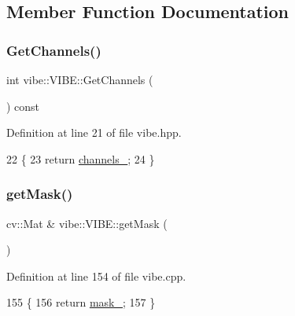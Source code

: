 \subsection{Member Function Documentation}
\mbox{\label{classvibe_1_1_v_i_b_e_a8d325dc6deb7fc6e53e2c5074611c434}} 
\subsubsection{\texorpdfstring{Get\+Channels()}{GetChannels()}}
{\footnotesize\ttfamily int vibe\+::\+V\+I\+B\+E\+::\+Get\+Channels (\begin{DoxyParamCaption}{ }\end{DoxyParamCaption}) const\hspace{0.3cm}{\ttfamily [inline]}}



Definition at line 21 of file vibe.\+hpp.


\begin{DoxyCode}
22     \{
23         \textcolor{keywordflow}{return} \mbox{\hyperlink{classvibe_1_1_v_i_b_e_a141be141bc39ddd6b9dd04df62b5e3b9}{channels\_}};
24     \}
\end{DoxyCode}
\mbox{\label{classvibe_1_1_v_i_b_e_a8d8f40e61ee0bca8d7ab3fc4912a23dc}} 
\subsubsection{\texorpdfstring{get\+Mask()}{getMask()}}
{\footnotesize\ttfamily cv\+::\+Mat \& vibe\+::\+V\+I\+B\+E\+::get\+Mask (\begin{DoxyParamCaption}{ }\end{DoxyParamCaption})}



Definition at line 154 of file vibe.\+cpp.


\begin{DoxyCode}
155 \{
156     \textcolor{keywordflow}{return} \mbox{\hyperlink{classvibe_1_1_v_i_b_e_a7840cacb0f0c76e6280a8a4fad32e136}{mask\_}};
157 \}
\end{DoxyCode}
\mbox{\label{classvibe_1_1_v_i_b_e_a5ca071697edce3a8459f93cba2386516}} 
